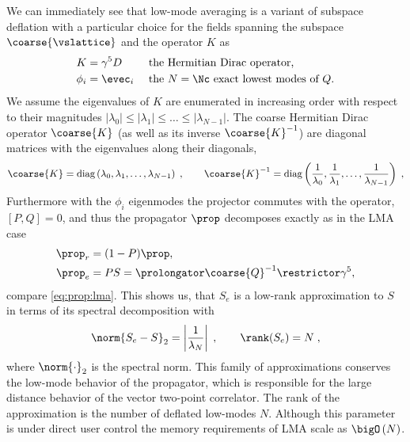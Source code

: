 We can immediately see that low-mode averaging is a variant of subspace deflation with a particular choice for the fields spanning the subspace $\coarse{\vslattice}$ and the operator $K$ as
\begin{align}
K &= \gamma^{5} D  &  &\text{ the Hermitian Dirac operator,} \\
\phi_i &= \evec_i  &  &\text{ the $N=\Nc$ exact lowest modes of $Q$.}
\end{align}
We assume the eigenvalues of $K$ are enumerated in increasing order with respect to their magnitudes $\lvert \lambda_0 \rvert \leq \lvert \lambda_1 \rvert \leq \ldots \leq \lvert \lambda_{N-1} \rvert$.
The coarse Hermitian Dirac operator $\coarse{K}$ (as well as its inverse $\coarse{K}^{-1}$) are diagonal matrices with the eigenvalues along their diagonals,
\begin{equation} \label{eq:sd:lma:diagonal:dirac}
\coarse{K} = \text{diag}\left(\lambda_0, \lambda_1, \ldots, \lambda_{N-1}\right) \;,
\qquad
\coarse{K}^{-1} = \text{diag}\left(\frac{1}{\lambda_0}, \frac{1}{\lambda_1}, \ldots, \frac{1}{\lambda_{N-1}}\right) \;,
\end{equation}
Furthermore with the $\phi_i$ eigenmodes the projector commutes with the operator, $[P,Q]=0$, and thus the propagator $\prop$ decomposes exactly as in the LMA case
\begin{align}
\prop_{r} &= (1-P) \prop, \\
\prop_{e} &= PS = \prolongator \coarse{Q}^{-1} \restrictor \gamma^5,
\end{align}
compare \cref{eq:prop:lma}.
This shows us, that $S_e$ is a low-rank approximation to $S$ in terms of its spectral decomposition with
\begin{equation}
\norm{S_e - S}_2
 = \left\lvert \frac{1}{\lambda_{N}} \right\rvert \;,
\qquad
\rank(S_e) = N \;,
\end{equation}
where $\norm{\cdot}_2$ is the spectral norm.
This family of approximations conserves the low-mode behavior of the propagator, which is responsible for the large distance behavior of the vector two-point correlator.
The rank of the approximation is the number of deflated low-modes $N$.
Although this parameter is under direct user control the memory requirements of LMA scale as $\bigO\left( N \right)$.

